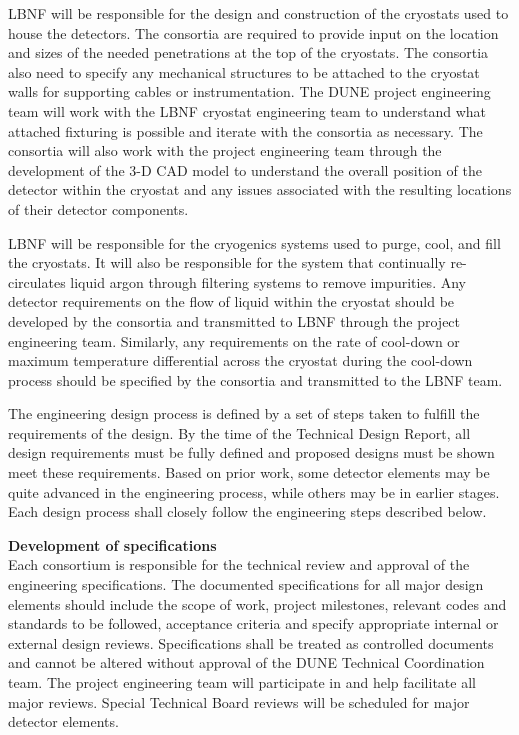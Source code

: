 LBNF will be responsible for the design and construction of the
cryostats used to house the detectors.  The consortia are required to
provide input on the location and sizes of the needed penetrations at
the top of the cryostats.  The consortia also need to specify any
mechanical structures to be attached to the cryostat walls for
supporting cables or instrumentation.  The DUNE project engineering
team will work with the LBNF cryostat engineering team to understand
what attached fixturing is possible and iterate with the consortia as
necessary.  The consortia will also work with the project engineering
team through the development of the 3-D CAD model to understand the
overall position of the detector within the cryostat and any issues
associated with the resulting locations of their detector components.

LBNF will be responsible for the cryogenics systems used to purge,
cool, and fill the cryostats.  It will also be responsible for the
system that continually re-circulates liquid argon through filtering
systems to remove impurities.  Any detector requirements on the flow
of liquid within the cryostat should be developed by the consortia and
transmitted to LBNF through the project engineering team.  Similarly,
any requirements on the rate of cool-down or maximum temperature
differential across the cryostat during the cool-down process should
be specified by the consortia and transmitted to the LBNF team.



\label{ssec:fdsp-coord-integ-eng-processes}

The engineering design process is defined by a set of steps taken to
fulfill the requirements of the design.  By the time of the Technical
Design Report, all design requirements must be fully defined and
proposed designs must be shown meet these requirements.  Based on
prior work, some detector elements may be quite advanced in the
engineering process, while others may be in earlier stages.  Each
design process shall closely follow the engineering steps described
below.


{\bf Development of specifications}\\
Each consortium is responsible for the technical review and approval
of the engineering specifications.  The documented specifications for
all major design elements should include the scope of work, project
milestones, relevant codes and standards to be followed, acceptance
criteria and specify appropriate internal or external design reviews.
Specifications shall be treated as controlled documents and cannot be
altered without approval of the DUNE Technical Coordination team.  The
project engineering team will participate in and help facilitate all
major reviews.  Special Technical Board reviews will be scheduled for
major detector elements.

